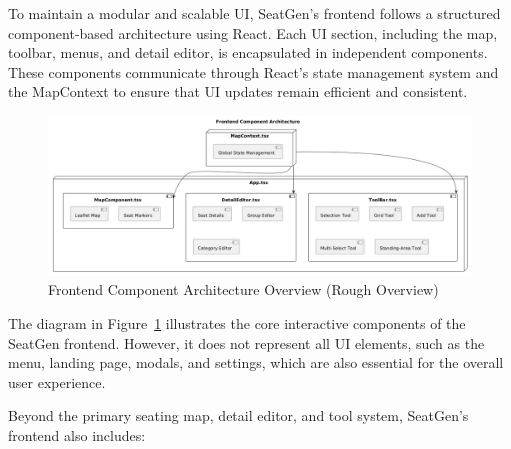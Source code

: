To maintain a modular and scalable UI, SeatGen’s frontend follows a structured component-based architecture using React. Each UI section, including the map, toolbar, menus, and detail editor, is encapsulated in independent components. These components communicate through React’s state management system and the MapContext to ensure that UI updates remain efficient and consistent.

\begin{figure}[H]
    \begin{center}
        \includegraphics[scale=0.3]{pics/frontend_architecture.png}
    \end{center}
    \caption{Frontend Component Architecture Overview (Rough Overview)}
    \label{fig:frontend-architecture}
\end{figure}

The diagram in Figure~\ref{fig:frontend-architecture} illustrates the core interactive components of the SeatGen frontend. However, it does not represent all UI elements, such as the menu, landing page, modals, and settings, which are also essential for the overall user experience.

Beyond the primary seating map, detail editor, and tool system, SeatGen's frontend also includes:

